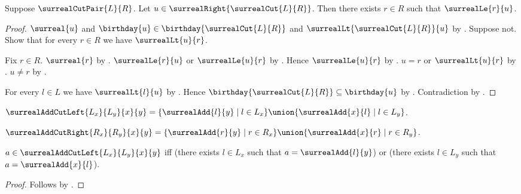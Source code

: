 \begin{lemma}\label{surreal_cut_right_interpolation}
    Suppose $\surrealCutPair{L}{R}$.
    Let $u\in\surrealRight{\surrealCut{L}{R}}$.
    Then there exists $r\in R$ such that $\surrealLe{r}{u}$.
\end{lemma}
\begin{proof}
    $\surreal{u}$ and
        $\birthday{u}\in\birthday{\surrealCut{L}{R}}$ and
        $\surrealLt{\surrealCut{L}{R}}{u}$
        by .
    Suppose not.
    Show that for every $r\in R$ we have $\surrealLt{u}{r}$.
    \begin{subproof}
        Fix $r\in R$.
        $\surreal{r}$ by .
        $\surrealLe{r}{u}$ or $\surrealLe{u}{r}$
            by .
        Hence $\surrealLe{u}{r}$ by \auto.
        $u=r$ or $\surrealLt{u}{r}$ by .
        $u\neq r$ by \auto.
    \end{subproof}
    For every $l\in L$ we have $\surrealLt{l}{u}$
        by
        .
    Hence $\birthday{\surrealCut{L}{R}}\subseteq\birthday{u}$
        by .
    Contradiction by .
\end{proof}

\begin{definition}\label{surreal_add_cut_left}
    $\surrealAddCutLeft{L_x}{L_y}{x}{y}=
        \{\surrealAdd{l}{y}\mid l\in L_x\}
        \union
        \{\surrealAdd{x}{l}\mid l\in L_y\}$.
\end{definition}

\begin{definition}\label{surreal_add_cut_right}
    $\surrealAddCutRight{R_x}{R_y}{x}{y}=
        \{\surrealAdd{r}{y}\mid r\in R_x\}
        \union
        \{\surrealAdd{x}{r}\mid r\in R_y\}$.
\end{definition}

\begin{proposition}\label{surreal_add_cut_left_iff}
    $a\in\surrealAddCutLeft{L_x}{L_y}{x}{y}$ iff
        (there exists $l\in L_x$ such that $a=\surrealAdd{l}{y}$) or
        (there exists $l\in L_y$ such that $a=\surrealAdd{x}{l}$).
\end{proposition}
\begin{proof}
    Follows by .
\end{proof}

